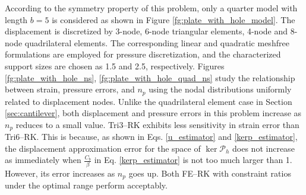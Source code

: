 According to the symmetry property of this problem, only a quarter model with length $b=5$ is considered as shown in Figure \ref{fg:plate_with_hole_model}. The displacement is discretized by 3-node, 6-node triangular elements, 4-node and 8-node quadrilateral elements. The corresponding linear and quadratic meshfree formulations are employed for pressure discretization, and the characterized support sizes are chosen as 1.5 and 2.5, respectively.
Figures \ref{fg:plate_with_hole_ns}, \ref{fg:plate_with_hole_quad_ns} study the relationship between strain, pressure errors, and $n_p$ using the nodal distributions uniformly related to displacement nodes.
Unlike the quadrilateral element case in Section \ref{sec:cantilever}, both displacement and pressure errors in this problem increase as $n_p$ reduces to a small value.
Tri3--RK exhibits less sensitivity in strain error than Tri6--RK.
This is because, as shown in Eqs. \eqref{u_estimator} and \eqref{kerp_estimator}, the displacement approximation error for the space of $\ker \mathcal P_h$ does not increase as immediately when $\frac{C_b}{\beta}$ in Eq. \eqref{kerp_estimator} is not too much larger than 1.
However, its error increases as $n_p$ goes up.
Both FE--RK with constraint ratios under the optimal range perform acceptably. 

